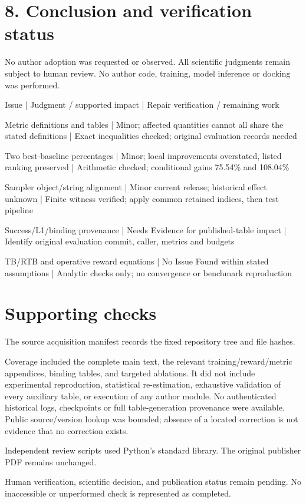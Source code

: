 \documentclass[10pt]{article}
\begin{document}
\section*{8. Conclusion and verification status}
No author adoption was requested or observed. All scientific judgments remain subject to human review. No author code, training, model inference or docking was performed.\par
Issue | Judgment / supported impact | Repair verification / remaining work\par
Metric definitions and tables | Minor; affected quantities cannot all share the stated definitions | Exact inequalities checked; original evaluation records needed\par
Two best-baseline percentages | Minor; local improvements overstated, listed ranking preserved | Arithmetic checked; conditional gains 75.54\% and 108.04\%\par
Sampler object/string alignment | Minor current release; historical effect unknown | Finite witness verified; apply common retained indices, then test pipeline\par
Success/L1/binding provenance | Needs Evidence for published-table impact | Identify original evaluation commit, caller, metrics and budgets\par
TB/RTB and operative reward equations | No Issue Found within stated assumptions | Analytic checks only; no convergence or benchmark reproduction\par
\section*{Supporting checks}
The source acquisition manifest records the fixed repository tree and file hashes.\par
Coverage included the complete main text, the relevant training/reward/metric appendices, binding tables, and targeted ablations. It did not include experimental reproduction, statistical re-estimation, exhaustive validation of every auxiliary table, or execution of any author module. No authenticated historical logs, checkpoints or full table-generation provenance were available. Public source/version lookup was bounded; absence of a located correction is not evidence that no correction exists.\par
Independent review scripts used Python’s standard library. The original publisher PDF remains unchanged.\par
Human verification, scientific decision, and publication status remain pending. No inaccessible or unperformed check is represented as completed.\par
\end{document}
